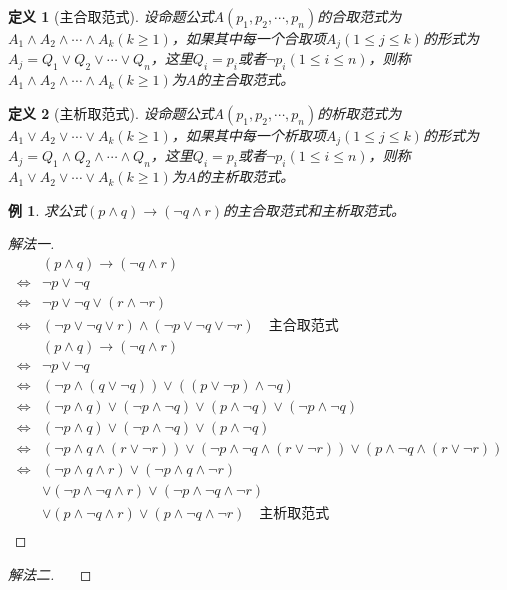 \documentclass{article}
\newtheorem{Def}{定义}
\newtheorem*{Example}{例}
\begin{document}
\begin{CJK*}{UTF8}{gbsn}
\begin{Def}[主合取范式]
  设命题公式$A(p_1,p_2,\cdots, p_n)$的合取范式为$A_1\land A_2\land \cdots \land A_k(k\geq 1)$，如果其中每一个合取项$A_j(1\leq j \leq k)$的形式为$A_j=Q_1\lor Q_2\lor \cdots \lor Q_n$，这里$Q_i=p_i$或者$\lnot p_i(1\leq i \leq n)$，则称$A_1\land A_2\land \cdots \land A_k(k\geq 1)$为$A$的主合取范式。
\end{Def}  
\begin{Def}[主析取范式]
  设命题公式$A(p_1,p_2,\cdots, p_n)$的析取范式为$A_1\lor A_2\lor \cdots \lor A_k(k\geq 1)$，如果其中每一个析取项$A_j(1\leq j \leq k)$的形式为$A_j=Q_1\land Q_2\land \cdots \land Q_n$，这里$Q_i=p_i$或者$\lnot p_i(1\leq i \leq n)$，则称$A_1\lor A_2\lor \cdots \lor A_k(k\geq 1)$为$A$的主析取范式。
\end{Def} 
  \begin{Example}
    求公式$(p\land q)\to (\lnot q \land r)$的主合取范式和主析取范式。
  \end{Example}
  \begin{proof}[解法一]
    \begin{equation*}
      \begin{split}
        &(p\land q)\to (\lnot q \land r)\\
        \Leftrightarrow&\lnot p\lor \lnot q\\
        \Leftrightarrow&\lnot p\lor \lnot q \lor (r\land \lnot r)\\
        \Leftrightarrow&(\lnot p\lor \lnot q \lor r)\land (\lnot p\lor \lnot q \lor \lnot r)\quad\text{主合取范式}\\
        &(p\land q)\to (\lnot q \land r)\\
        \Leftrightarrow&\lnot p\lor \lnot q\\
        \Leftrightarrow&(\lnot p \land (q\lor \lnot q))\lor ((p\lor \lnot p)\land \lnot q)\\
        \Leftrightarrow&(\lnot p \land q)\lor(\lnot p \land \lnot q)\lor (p\land \lnot q)\lor (\lnot p\land \lnot q)\\
        \Leftrightarrow&(\lnot p \land q)\lor(\lnot p \land \lnot q)\lor (p\land \lnot q)\\
        \Leftrightarrow&(\lnot p \land q \land (r\lor \lnot r))\lor(\lnot p \land \lnot q\land (r\lor \lnot r))\lor (p\land \lnot q\land (r\lor \lnot r))\\
        \Leftrightarrow&(\lnot p \land q \land r)\lor(\lnot p \land q \land \lnot r)\\
        &\lor(\lnot p \land \lnot q\land r)\lor( \lnot p \land \lnot q\land\lnot r)\\
        &\lor (p\land \lnot q\land r)\lor(p\land \lnot q\land \lnot r)\quad \text{主析取范式}\\
      \end{split}
    \end{equation*}
  \end{proof}
  \begin{proof}[解法二]$\quad$


\end{proof}
\end{CJK*}
\end{document}
